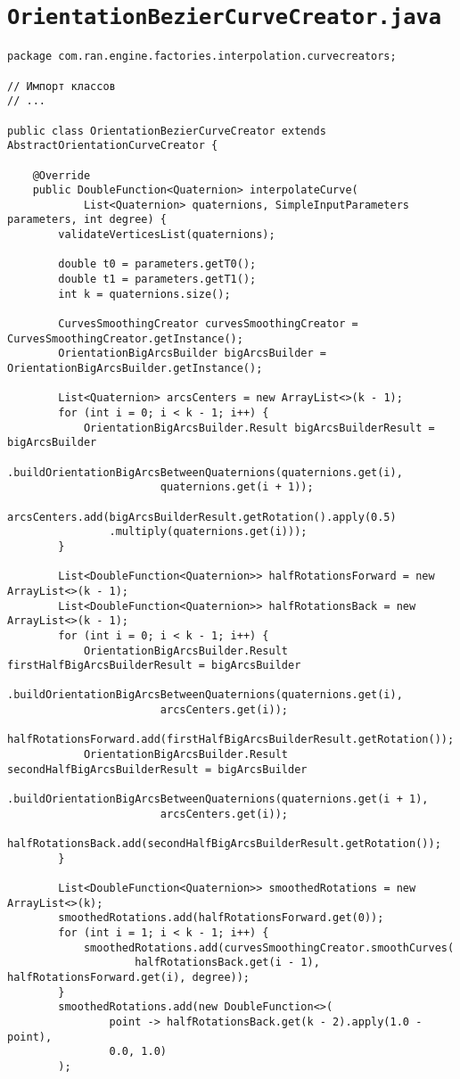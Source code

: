 \section*{\texttt{OrientationBezierCurveCreator.java}}
\begin{verbatim}
package com.ran.engine.factories.interpolation.curvecreators;

// Импорт классов
// ...

public class OrientationBezierCurveCreator extends AbstractOrientationCurveCreator {

    @Override
    public DoubleFunction<Quaternion> interpolateCurve(
            List<Quaternion> quaternions, SimpleInputParameters parameters, int degree) {
        validateVerticesList(quaternions);

        double t0 = parameters.getT0();
        double t1 = parameters.getT1();
        int k = quaternions.size();

        CurvesSmoothingCreator curvesSmoothingCreator = CurvesSmoothingCreator.getInstance();
        OrientationBigArcsBuilder bigArcsBuilder = OrientationBigArcsBuilder.getInstance();

        List<Quaternion> arcsCenters = new ArrayList<>(k - 1);
        for (int i = 0; i < k - 1; i++) {
            OrientationBigArcsBuilder.Result bigArcsBuilderResult = bigArcsBuilder
                    .buildOrientationBigArcsBetweenQuaternions(quaternions.get(i),
                        quaternions.get(i + 1));
            arcsCenters.add(bigArcsBuilderResult.getRotation().apply(0.5)
                .multiply(quaternions.get(i)));
        }

        List<DoubleFunction<Quaternion>> halfRotationsForward = new ArrayList<>(k - 1);
        List<DoubleFunction<Quaternion>> halfRotationsBack = new ArrayList<>(k - 1);
        for (int i = 0; i < k - 1; i++) {
            OrientationBigArcsBuilder.Result firstHalfBigArcsBuilderResult = bigArcsBuilder
                    .buildOrientationBigArcsBetweenQuaternions(quaternions.get(i),
                        arcsCenters.get(i));
            halfRotationsForward.add(firstHalfBigArcsBuilderResult.getRotation());
            OrientationBigArcsBuilder.Result secondHalfBigArcsBuilderResult = bigArcsBuilder
                    .buildOrientationBigArcsBetweenQuaternions(quaternions.get(i + 1),
                        arcsCenters.get(i));
            halfRotationsBack.add(secondHalfBigArcsBuilderResult.getRotation());
        }

        List<DoubleFunction<Quaternion>> smoothedRotations = new ArrayList<>(k);
        smoothedRotations.add(halfRotationsForward.get(0));
        for (int i = 1; i < k - 1; i++) {
            smoothedRotations.add(curvesSmoothingCreator.smoothCurves(
                    halfRotationsBack.get(i - 1), halfRotationsForward.get(i), degree));
        }
        smoothedRotations.add(new DoubleFunction<>(
                point -> halfRotationsBack.get(k - 2).apply(1.0 - point),
                0.0, 1.0)
        );


\end{verbatim}
